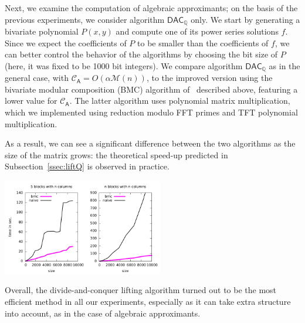 \documentclass[sigconf]{acmart}
\newcommand{\mA}{\ensuremath{\mathsf{A}}}
\newcommand{\Q}{\ensuremath{\mathbb{Q}}}
\newcommand{\M}{\ensuremath{\mathscr{M}}}
\newcommand{\CA}{\ensuremath{\mathscr{C}_\mA}}
\newcommand{\DACQ}{\ensuremath{\mathsf{DAC}_\Q}}
\theoremstyle{acmdefinition}
\begin{document}
Next, we examine the computation of algebraic approximants; on the
basis of the previous experiments, we consider algorithm $\DACQ$ only.
We start by generating a bivariate polynomial $P(x,y)$ and compute one
of its power series solutions $f$. Since we expect the coefficients of
$P$ to be smaller than the coefficients of $f$, we can better control
the behavior of the algorithms by choosing the bit size of $P$ (here,
it was fixed to be 1000 bit integers).  We compare algorithm $\DACQ$
as in the general case, with $\CA=O(\alpha \M(n))$, to the improved
version using the bivariate modular composition (BMC) algorithm
of~\cite{NuZi04} described above, featuring a lower value for
$\CA$. The latter algorithm uses polynomial matrix multiplication,
which we implemented using reduction modulo FFT primes and TFT
polynomial multiplication.

As a result, we can see a significant difference between the two
algorithms as the size of the matrix grows: the theoretical speed-up
predicted in Subsection~\ref{ssec:liftQ} is observed in practice.

\includegraphics[width=7cm]{plots/compare-algebraic.pdf}

Overall, the divide-and-conquer lifting algorithm turned out to be the
most efficient method in all our experiments, especially as it can
take extra structure into account, as in the case of algebraic
approximants.



 {\tiny }
\end{document}
